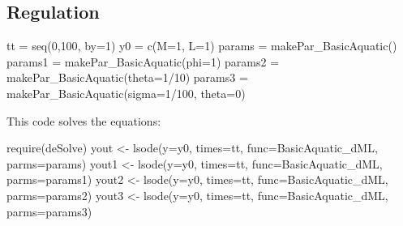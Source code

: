\documentclass[
]{book}
\newenvironment{Shaded}{\begin{snugshade}}{\end{snugshade}}
\newcommand{\AttributeTok}[1]{\textcolor[rgb]{0.77,0.63,0.00}{#1}}
\newcommand{\DecValTok}[1]{\textcolor[rgb]{0.00,0.00,0.81}{#1}}
\newcommand{\FunctionTok}[1]{\textcolor[rgb]{0.00,0.00,0.00}{#1}}
\newcommand{\NormalTok}[1]{#1}
\newcommand{\OtherTok}[1]{\textcolor[rgb]{0.56,0.35,0.01}{#1}}
\newcommand{\SpecialCharTok}[1]{\textcolor[rgb]{0.00,0.00,0.00}{#1}}
\begin{document}
\hypertarget{regulation}{%
\subsection{Regulation}\label{regulation}}

\begin{Shaded}
\begin{Highlighting}[]
\NormalTok{tt }\OtherTok{=} \FunctionTok{seq}\NormalTok{(}\DecValTok{0}\NormalTok{,}\DecValTok{100}\NormalTok{, }\AttributeTok{by=}\DecValTok{1}\NormalTok{) }
\NormalTok{y0 }\OtherTok{=} \FunctionTok{c}\NormalTok{(}\AttributeTok{M=}\DecValTok{1}\NormalTok{, }\AttributeTok{L=}\DecValTok{1}\NormalTok{)}
\NormalTok{params }\OtherTok{=} \FunctionTok{makePar\_BasicAquatic}\NormalTok{()}
\NormalTok{params1 }\OtherTok{=} \FunctionTok{makePar\_BasicAquatic}\NormalTok{(}\AttributeTok{phi=}\DecValTok{1}\NormalTok{)}
\NormalTok{params2 }\OtherTok{=} \FunctionTok{makePar\_BasicAquatic}\NormalTok{(}\AttributeTok{theta=}\DecValTok{1}\SpecialCharTok{/}\DecValTok{10}\NormalTok{)}
\NormalTok{params3 }\OtherTok{=} \FunctionTok{makePar\_BasicAquatic}\NormalTok{(}\AttributeTok{sigma=}\DecValTok{1}\SpecialCharTok{/}\DecValTok{100}\NormalTok{, }\AttributeTok{theta=}\DecValTok{0}\NormalTok{)}
\end{Highlighting}
\end{Shaded}

This code solves the equations:

\begin{Shaded}
\begin{Highlighting}[]
\FunctionTok{require}\NormalTok{(deSolve)}
\NormalTok{yout  }\OtherTok{\textless{}{-}} \FunctionTok{lsode}\NormalTok{(}\AttributeTok{y=}\NormalTok{y0, }\AttributeTok{times=}\NormalTok{tt, }\AttributeTok{func=}\NormalTok{BasicAquatic\_dML, }\AttributeTok{parms=}\NormalTok{params) }
\NormalTok{yout1 }\OtherTok{\textless{}{-}} \FunctionTok{lsode}\NormalTok{(}\AttributeTok{y=}\NormalTok{y0, }\AttributeTok{times=}\NormalTok{tt, }\AttributeTok{func=}\NormalTok{BasicAquatic\_dML, }\AttributeTok{parms=}\NormalTok{params1) }
\NormalTok{yout2 }\OtherTok{\textless{}{-}} \FunctionTok{lsode}\NormalTok{(}\AttributeTok{y=}\NormalTok{y0, }\AttributeTok{times=}\NormalTok{tt, }\AttributeTok{func=}\NormalTok{BasicAquatic\_dML, }\AttributeTok{parms=}\NormalTok{params2) }
\NormalTok{yout3 }\OtherTok{\textless{}{-}} \FunctionTok{lsode}\NormalTok{(}\AttributeTok{y=}\NormalTok{y0, }\AttributeTok{times=}\NormalTok{tt, }\AttributeTok{func=}\NormalTok{BasicAquatic\_dML, }\AttributeTok{parms=}\NormalTok{params3) }
\end{Highlighting}
\end{Shaded}
\end{document}
